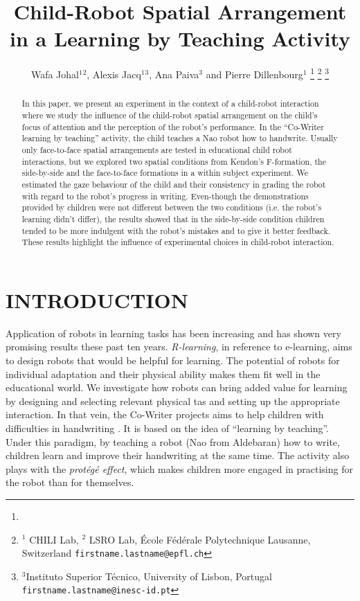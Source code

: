 \documentclass[letterpaper, 10 pt, conference]{ieeeconf}  %
\title{\LARGE \bf
Child-Robot Spatial Arrangement in a Learning by Teaching Activity}
\author{Wafa Johal$^{1}$$^{2}$, Alexis Jacq$^{1}$$^{3}$, Ana Paiva$^{3}$ and Pierre Dillenbourg$^{1}$  %
\thanks{}%
\thanks{$^{1}$ CHILI Lab,
	$^{2}$ LSRO Lab,
        \'{E}cole F\'{e}d\'{e}rale Polytechnique Lausanne, Switzerland
        {\tt\small firstname.lastname@epfl.ch}}%
\thanks{$^{3}$Instituto Superior T\'{e}cnico, University of Lisbon, Portugal
        {\tt\small firstname.lastname@inesc-id.pt}}%
}
\begin{document}
\maketitle


\begin{abstract}
In this paper, we present an experiment in the context of a child-robot interaction where we study the influence of the child-robot spatial arrangement on the child's focus of attention and the perception of the robot's performance. In the ``Co-Writer learning by teaching'' activity, the child teaches a Nao robot how to handwrite.
Usually only face-to-face spatial arrangements are tested in educational child robot interactions, but we explored two spatial conditions from Kendon's F-formation, the side-by-side and the face-to-face formations in a within subject experiment.
We estimated the gaze behaviour of the child and their consistency in grading the robot with regard to the robot's progress in writing. 
Even-though the demonstrations provided by children were not different between the two conditions (i.e. the robot's learning didn't differ),  the results showed that in the side-by-side condition children tended to be more indulgent with the robot's mistakes and to give it better feedback.
These results highlight the influence of experimental choices in child-robot interaction.
\end{abstract}


\section{INTRODUCTION}

Application of robots in learning tasks has been increasing and has shown very promising results these past ten years. 
\emph{R-learning}, in reference to e-learning, aims to design robots that would be helpful for learning.
The potential of robots for individual adaptation and their physical ability makes them fit well in the educational world.
We investigate how robots can bring added value for learning by designing and selecting relevant physical tas and setting up the appropriate interaction.
In that vein, the Co-Writer projects aims to help children with difficulties in handwriting \cite{hood2015when}.
It is based on the idea of ``learning by teaching''.
Under this paradigm, by teaching a robot (Nao from Aldebaran) how to write, children learn and improve their handwriting at the same time.
The activity also plays with the \emph{protégé effect}, which makes children more engaged in practising for the robot than for themselves.
\end{document}
